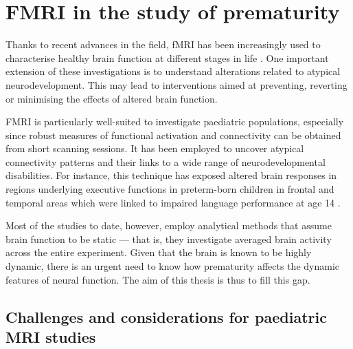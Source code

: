 \section{FMRI in the study of prematurity}
\label{sub:fMRI_in_preterm}


Thanks to recent advances in the field, fMRI has been increasingly used to characterise healthy brain function at different stages in life \citep{Power2010}. 
One important extension of these investigations is to understand alterations related to atypical neurodevelopment. 
This may lead to interventions aimed at preventing, reverting or minimising the effects of altered brain function.


FMRI is particularly well-suited to investigate paediatric populations, especially since robust measures of functional activation and connectivity can be obtained from short scanning sessions. It has been employed to uncover atypical connectivity patterns and their links to a wide range of neurodevelopmental disabilities. For instance, this technique has exposed altered brain responses in regions underlying executive functions in preterm-born children in frontal \citep{Reveillon2013,Murner-Lavanchy2014} and temporal areas \citep{Kwon2014a, Wilke2014} which were linked to impaired language performance at age 14 \citep{Wilke2014}.

Most of the studies to date, however, employ analytical methods that assume brain function to be static --- that is, they investigate averaged brain activity across the entire experiment. Given that the brain is known to be highly dynamic, there is an urgent need to know how prematurity affects the dynamic features of neural function. The aim of this thesis is thus to fill this gap.



\subsection{Challenges and considerations for paediatric MRI studies}


